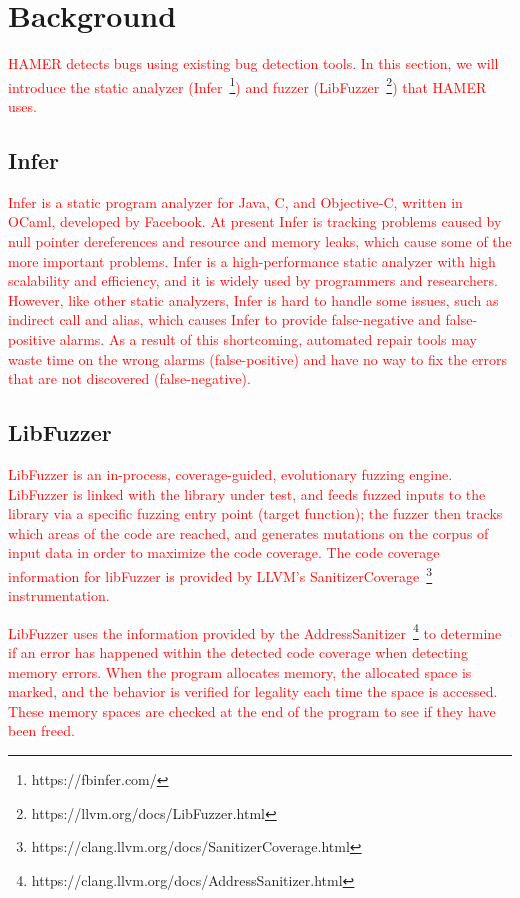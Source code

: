 \documentclass[a4paper,11pt,oneside,openany]{book}
\begin{document}

\chapter{Background}
\textcolor{red}{
HAMER detects bugs using existing bug detection tools. In this section, we will introduce the static analyzer (Infer~\footnote{https://fbinfer.com/}) and fuzzer (LibFuzzer~\footnote{https://llvm.org/docs/LibFuzzer.html}) that HAMER uses.
}
\section{Infer}
\textcolor{red}{
Infer is a static program analyzer for Java, C, and Objective-C, written in OCaml, developed by Facebook. At present Infer is tracking problems caused by null pointer dereferences and resource and memory leaks, which cause some of the more important problems. Infer is a high-performance static analyzer with high scalability and efficiency, and it is widely used by programmers and researchers. However, like other static analyzers, Infer is hard to handle some issues, such as indirect call and alias, which causes Infer to provide false-negative and false-positive alarms. As a result of this shortcoming, automated repair tools may waste time on the wrong alarms (false-positive) and have no way to fix the errors that are not discovered (false-negative).
}

\section{LibFuzzer}
\textcolor{red}{
LibFuzzer is an in-process, coverage-guided, evolutionary fuzzing engine. LibFuzzer is linked with the library under test, and feeds fuzzed inputs to the library via a specific fuzzing entry point (target function); the fuzzer then tracks which areas of the code are reached, and generates mutations on the corpus of input data in order to maximize the code coverage. The code coverage information for libFuzzer is provided by LLVM’s SanitizerCoverage~\footnote{https://clang.llvm.org/docs/SanitizerCoverage.html} instrumentation.
}	

\textcolor{red}{
LibFuzzer uses the information provided by the AddressSanitizer~\footnote{https://clang.llvm.org/docs/AddressSanitizer.html} to determine if an error has happened within the detected code coverage when detecting memory errors. When the program allocates memory, the allocated space is marked, and the behavior is verified for legality each time the space is accessed. These memory spaces are checked at the end of the program to see if they have been freed.
}
\end{document}
